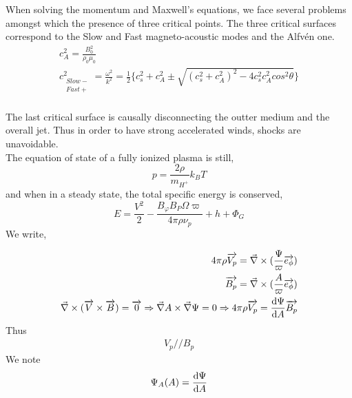 \documentclass[10pt,a4paper,english]{article}
\begin{document}
When solving the momentum and Maxwell's equations, we face several problems amongst which the presence of three critical points. The three critical surfaces correspond to the Slow and Fast magneto-acoustic modes and the Alfvén one.
\begin{align}
   c^{2}_{A} = \frac{B^{2}_{0}}{\rho_{0}\mu_{0}} \\
  c^{2}_{\substack{Slow- \\Fast+}} = \frac{\omega^{2}}{k^{2}}= \frac{1}{2}\lbrace c^{2}_{s} + c^{2}_{A} \pm \sqrt{(c^{2}_{s}+c^{2}_{A})^{2} - 4c^{2}_{s}c^{2}_{A}cos^{2}\theta}\rbrace \\
\end{align}

The last critical surface is causally disconnecting the outter medium and the overall jet. Thus in order to have strong accelerated winds, shocks are unavoidable.
\\
The equation of state of a fully ionized plasma is still,
\begin{equation}
   p = \frac{2\rho}{m_{H^{+}}} k_{B}T
\end{equation}
and when in a steady state, the total specific energy is conserved,
\begin{equation}
   E = \frac{V^{2}}{2}-\frac{B_{\varphi}B_{P}\Omega\varpi}{4\pi\rho\nu_{p}}+h+\Phi_{G}
\end{equation}
We write,

\begin{align}
   4\pi\rho\overrightarrow{V_{p}} = \vec\nabla \times (\frac{\Psi}{\varpi}\overrightarrow{e_{\phi}}) \\
  \overrightarrow{B_{p}} = \vec\nabla \times (\frac{A}{\varpi}\overrightarrow{e_{\phi}}) \\
  \vec \nabla \times (\overrightarrow{V} \times \overrightarrow{B}) = \overrightarrow{0} \Rightarrow \vec \nabla A \times \vec \nabla \Psi = 0 \Rightarrow 4\pi\rho\overrightarrow{V_{p}} = \frac{\mathrm{d}{\Psi}}{\mathrm{d}{A}}\overrightarrow{B_{p}} 
\end{align}
Thus
\begin{align*}
   V_{p} // B_{p}
\end{align*}
We note 
\begin{align*}
  \Psi_{A}(A) = \frac{\mathrm{d}{\Psi}}{\mathrm{d}{A}}
\end{align*}
\end{document}

